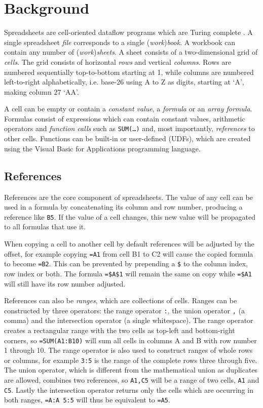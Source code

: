 \documentclass[times]{smrauth}
\begin{document}
\section{Background}

Spreadsheets are cell-oriented dataflow programs which are Turing complete \cite{ExcelTuringComplete}.
A single spreadsheet \emph{file} corresponds to a single (\emph{work})\emph{book}.
A workbook can contain any number of (\emph{work})\emph{sheets}.
A sheet consists of a two-dimensional grid of \emph{cells}.
The grid consists of horizontal \emph{rows} and vertical \emph{columns}.
Rows are numbered sequentially top-to-bottom starting at 1, while columns are numbered left-to-right alphabetically, i.e. base-26 using A to Z as digits, starting at `A', making column 27 `AA'.

A cell can be empty or contain a \emph{constant value}, a \emph{formula} or an \emph{array formula}.
Formulas consist of expressions which can contain constant values, arithmetic operators and \emph{function calls} such as \texttt{SUM(\ldots)} and, most importantly, \emph{references} to other cells.
Functions can be built-in or user-defined (UDFs), which are created using the Visual Basic for Applications programming language.

\subsection{References}
\label{subsec:references}
References are the core component of spreadsheets.
The value of any cell can be used in a formula by concatenating its column and row number, producing a reference like \texttt{B5}.
If the value of a cell changes, this new value will be propagated to all formulas that use it.

When copying a cell to another cell by default references will be adjusted by the offset, for example copying \texttt{=A1} from cell B1 to C2 will cause the copied formula to become \texttt{=B2}.
This can be prevented by prepending a \texttt{\$} to the column index, row index or both.
The formula \texttt{=\$A\$1} will remain the same on copy while \texttt{=\$A1} will still have its row number adjusted.

References can also be \emph{ranges}, which are collections of cells.
Ranges can be constructed by three operators: the range operator \texttt{:}, the union operator \texttt{,} (a comma) and the intersection operator \texttt{} (a single whitespace).
The range operator creates a rectangular range with the two cells as top-left and bottom-right corners, so \texttt{=SUM(A1:B10)} will sum all cells in columns A and B with row number 1 through 10.
The range operator is also used to construct ranges of whole rows or columns, for example \texttt{3:5} is the range of the complete rows three through five.
The union operator, which is different from the mathematical union as duplicates are allowed, combines two references, so \texttt{A1,C5} will be a range of two cells, \texttt{A1} and \texttt{C5}.
Lastly the intersection operator returns only the cells which are occurring in both ranges, \texttt{=A:A 5:5} will thus be equivalent to \texttt{=A5}.
\end{document}
